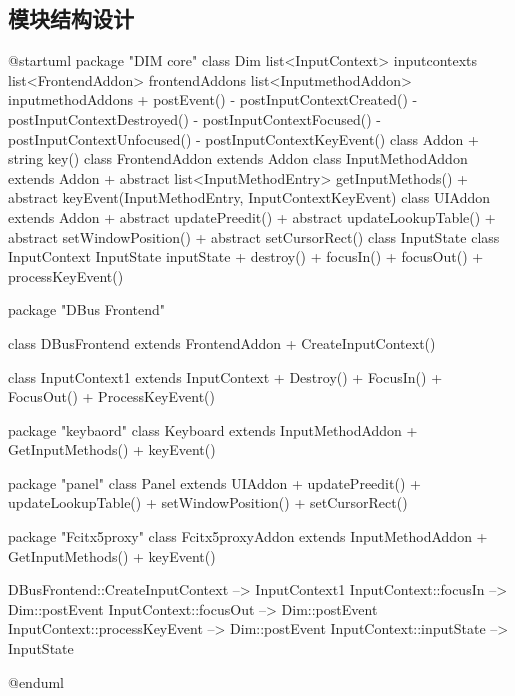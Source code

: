\documentclass{utart}
\begin{document}
    \subsection{模块结构设计}
        \begin{plantuml}
        @startuml
        package "DIM core" {
            class Dim {
                list<InputContext> inputcontexts
                list<FrontendAddon> frontendAddons
                list<InputmethodAddon> inputmethodAddons
                + postEvent()
                - postInputContextCreated()
                - postInputContextDestroyed()
                - postInputContextFocused()
                - postInputContextUnfocused()
                - postInputContextKeyEvent()
            }
            class Addon {
                + string key()
            }
            class FrontendAddon extends Addon {
            }
            class InputMethodAddon extends Addon {
                + {abstract} list<InputMethodEntry> getInputMethods()
                + {abstract} keyEvent(InputMethodEntry, InputContextKeyEvent)
            }
            class UIAddon extends Addon {
                + {abstract} updatePreedit()
                + {abstract} updateLookupTable()
                + {abstract} setWindowPosition()
                + {abstract} setCursorRect()
            }
            class InputState {
            }
            class InputContext {
                InputState inputState
                + destroy()
                + focusIn()
                + focusOut()
                + processKeyEvent()
            }
        }

        package "DBus Frontend" {
            class DBusFrontend extends FrontendAddon {
                + CreateInputContext()
            }

            class InputContext1 extends InputContext {
                + Destroy()
                + FocusIn()
                + FocusOut()
                + ProcessKeyEvent()
            }
        }

        package "keybaord" {
            class Keyboard extends InputMethodAddon {
                + GetInputMethods()
                + keyEvent()
            }
        }

        package "panel" {
            class Panel extends UIAddon {
                + updatePreedit()
                + updateLookupTable()
                + setWindowPosition()
                + setCursorRect()
            }
        }

        package "Fcitx5proxy" {
            class Fcitx5proxyAddon extends InputMethodAddon {
                + GetInputMethods()
                + keyEvent()
            }
        }

        DBusFrontend::CreateInputContext --> InputContext1
        InputContext::focusIn --> Dim::postEvent
        InputContext::focusOut --> Dim::postEvent
        InputContext::processKeyEvent --> Dim::postEvent
        InputContext::inputState --> InputState

        @enduml
        \end{plantuml}
\end{document}
